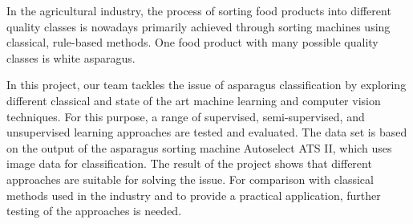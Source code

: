 \label{Abstract}

In the agricultural industry, the process of sorting food products into different quality classes is nowadays primarily achieved through sorting machines using classical, rule-based methods. One food product with many possible quality classes is white asparagus.

In this project, our team tackles the issue of asparagus classification by exploring different classical and state of the art machine learning and computer vision techniques. For this purpose, a range of supervised, semi-supervised, and unsupervised learning approaches are tested and evaluated. The data set is based on the output of the asparagus sorting machine Autoselect ATS II, which uses image data for classification. The result of the project shows that different approaches are suitable for solving the issue. For comparison with classical methods used in the industry and to provide a practical application, further testing of the approaches is needed.
